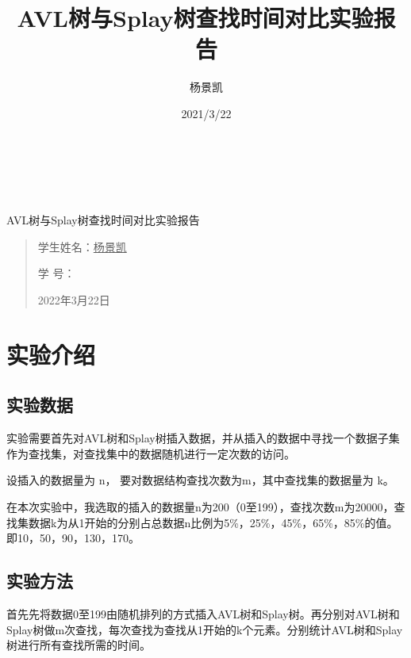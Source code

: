 \documentclass[UTF8]{ctexart}
\date{}
\title{AVL树与Splay树查找时间对比实验报告}
\author{杨景凯}
\date{2021/3/22}
\begin{document}
 
\begin{center}
    \quad \\
    \quad \\
    \quad \\
    \vskip 3.5cm
    \heiti {}AVL树与Splay树查找时间对比实验报告\\
\end{center}
\vskip 3.5cm
\begin{quotation}
    \songti \fontsize{30}{30}
    \doublespacing
    \par\setlength\parindent{12em}
    \quad 
\begin{center}

    学生姓名：\underline{\qquad    \quad \quad 杨景凯    \quad  \quad\qquad }

    学\hspace{0.61cm} 号：\underline{\quad \quad{}\quad\quad}

\end{center}
    
    \centering
    2022年3月22日
\end{quotation}
\clearpage
\tableofcontents
\clearpage
\section{实验介绍}
\subsection{实验数据}

实验需要首先对AVL树和Splay树插入数据，并从插入的数据中寻找一个数据子集作为查找集，对查找集中的数据随机进行一定次数的访问。

设插入的数据量为 n， 要对数据结构查找次数为m，其中查找集的数据量为 k。

在本次实验中，我选取的插入的数据量n为200（0至199），查找次数m为20000，查找集数据k为从1开始的分别占总数据n比例为5\%，25\%，45\%，65\%，85\%的值。即10，50，90，130，170。

\subsection{实验方法}

首先先将数据0至199由随机排列的方式插入AVL树和Splay树。再分别对AVL树和Splay树做m次查找，每次查找为查找从1开始的k个元素。分别统计AVL树和Splay树进行所有查找所需的时间。
\end{document}
